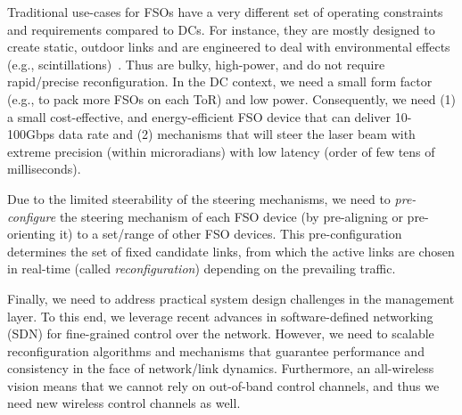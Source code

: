 \eat
{

{}
Traditional  use-cases for  FSOs  have a very different set of operating
constraints and requirements compared to DCs. For instance, they are mostly
designed to create static, outdoor links and are engineered to deal with
environmental  effects (e.g., scintillations)~\cite{}. Thus are bulky,
high-power,  and do not require rapid/precise reconfiguration.  In the DC
context, we need a small form factor (e.g., to pack more FSOs on each ToR) and
low power.  Consequently,  we need  (1) a small cost-effective, and
energy-efficient FSO device that can deliver 10-100Gbps data rate and (2)
mechanisms that will steer the laser beam with extreme precision (within
microradians) with low latency (order of few tens of milliseconds).


 Due to the
limited steerability of the  steering mechanisms, we need to
{\em pre-configure} the steering mechanism of each FSO device (by pre-aligning
or pre-orienting it) to a set/range of other FSO devices. This
pre-configuration determines the set of fixed candidate links, from which the
active links are chosen in real-time (called {\em reconfiguration}) depending
on the prevailing traffic.


 Finally, we
need to address practical system design challenges in the  management layer. To
this end, we leverage recent advances in software-defined networking  (SDN) for
fine-grained control over the network. However, we need to scalable
reconfiguration algorithms and mechanisms that guarantee performance and
consistency in the face of network/link dynamics.  Furthermore, an
all-wireless vision   means that we cannot rely on out-of-band control
channels, and thus we need new wireless control channels as well.  
}
 

